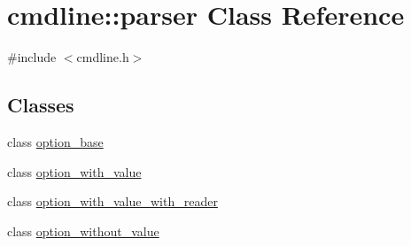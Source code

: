 \hypertarget{classcmdline_1_1parser}{}\section{cmdline\+::parser Class Reference}
\label{classcmdline_1_1parser}


{\ttfamily \#include $<$cmdline.\+h$>$}

\subsection*{Classes}
\begin{DoxyCompactItemize}
\item 
class \mbox{\hyperlink{classcmdline_1_1parser_1_1option__base}{option\+\_\+base}}
\item 
class \mbox{\hyperlink{classcmdline_1_1parser_1_1option__with__value}{option\+\_\+with\+\_\+value}}
\item 
class \mbox{\hyperlink{classcmdline_1_1parser_1_1option__with__value__with__reader}{option\+\_\+with\+\_\+value\+\_\+with\+\_\+reader}}
\item 
class \mbox{\hyperlink{classcmdline_1_1parser_1_1option__without__value}{option\+\_\+without\+\_\+value}}
\end{DoxyCompactItemize}
